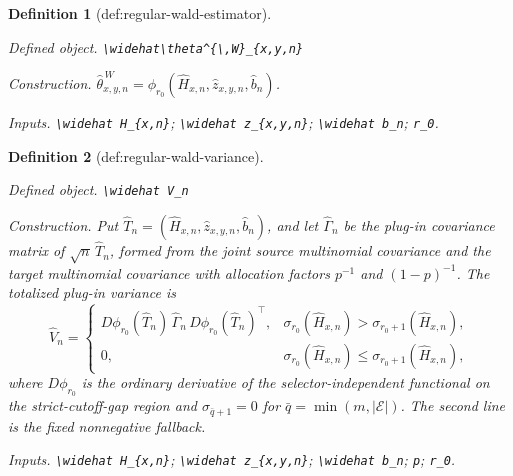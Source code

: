 \documentclass{article}
\newtheorem{definition}{Definition}
\begin{document}
\begin{definition}[def:regular-wald-estimator]\label{def:regular-wald-estimator}
\par\smallskip\noindent\emph{Defined object.} \texttt{\textbackslash{}\allowbreak{}widehat\textbackslash{}\allowbreak{}theta\textasciicircum{}\{\textbackslash{}\allowbreak{},\allowbreak{}W\}\allowbreak{}\_\allowbreak{}\{x,\allowbreak{}y,\allowbreak{}n\}\allowbreak{}}
\par\smallskip\noindent\emph{Construction.} \(\widehat\theta^{\,W}_{x,y,n}=\phi_{r_0}(\widehat H_{x,n},\widehat z_{x,y,n},\widehat b_n)\).
\par\smallskip\noindent\emph{Inputs.} \texttt{\textbackslash{}\allowbreak{}widehat H\_\allowbreak{}\{x,\allowbreak{}n\}\allowbreak{}}; \texttt{\textbackslash{}\allowbreak{}widehat z\_\allowbreak{}\{x,\allowbreak{}y,\allowbreak{}n\}\allowbreak{}}; \texttt{\textbackslash{}\allowbreak{}widehat b\_\allowbreak{}n}; \texttt{r\_\allowbreak{}0}.
\end{definition}

\begin{definition}[def:regular-wald-variance]\label{def:regular-wald-variance}
\par\smallskip\noindent\emph{Defined object.} \texttt{\textbackslash{}\allowbreak{}widehat V\_\allowbreak{}n}
\par\smallskip\noindent\emph{Construction.} Put \(\widehat T_n=(\widehat H_{x,n},\widehat z_{x,y,n},\widehat b_n)\), and let \(\widehat\Gamma_n\) be the plug-in covariance matrix of \(\sqrt n\,\widehat T_n\), formed from the joint source multinomial covariance and the target multinomial covariance with allocation factors \(p^{-1}\) and \((1-p)^{-1}\). The totalized plug-in variance is
\[
\widehat V_n=
\begin{cases}
D\phi_{r_0}(\widehat T_n)\,\widehat\Gamma_n\,D\phi_{r_0}(\widehat T_n)^{\top},
&\sigma_{r_0}(\widehat H_{x,n})>\sigma_{r_0+1}(\widehat H_{x,n}),\\
0,&\sigma_{r_0}(\widehat H_{x,n})\le\sigma_{r_0+1}(\widehat H_{x,n}),
\end{cases}
\]
where \(D\phi_{r_0}\) is the ordinary derivative of the selector-independent functional on the strict-cutoff-gap region and \(\sigma_{\bar q+1}=0\) for \(\bar q=\min(m,\lvert\mathcal E\rvert)\). The second line is the fixed nonnegative fallback.
\par\smallskip\noindent\emph{Inputs.} \texttt{\textbackslash{}\allowbreak{}widehat H\_\allowbreak{}\{x,\allowbreak{}n\}\allowbreak{}}; \texttt{\textbackslash{}\allowbreak{}widehat z\_\allowbreak{}\{x,\allowbreak{}y,\allowbreak{}n\}\allowbreak{}}; \texttt{\textbackslash{}\allowbreak{}widehat b\_\allowbreak{}n}; \texttt{p}; \texttt{r\_\allowbreak{}0}.
\end{definition}
\end{document}
